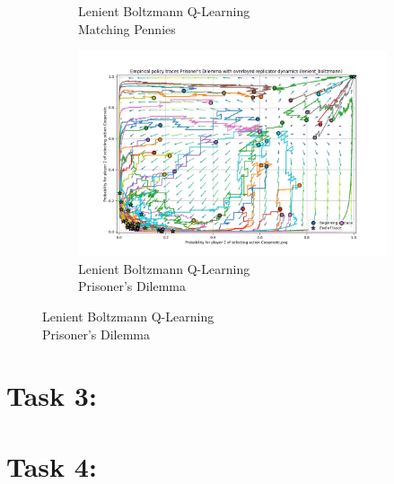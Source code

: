 \documentclass[12pt,letterpaper, onecolumn]{exam}
\begin{document}
\begin{figure}
\begin{subfigure}{.5\textwidth}
      \caption{Lenient Boltzmann Q-Learning\\ Matching Pennies}
      \label{fig:sfiglbmp}
    \end{subfigure}%
    \begin{subfigure}{.5\textwidth}
      \centering
      \includegraphics[width=.6\linewidth]{plots/replicator_trajectoreis_Prisoner's Dilemma_lenient_boltzmann.png}
      \caption{Lenient Boltzmann Q-Learning\\ Prisoner's Dilemma}
      \label{fig:sfiglbpd}
    \end{subfigure}%
\end{figure}
\subsection{}

\section{\textbf{Task 3:}}

\section{\textbf{Task 4:}}
\end{document}
